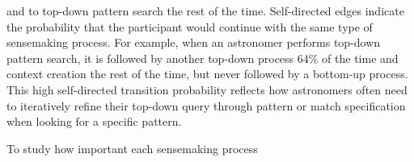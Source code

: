  and to top-down pattern search
 the rest of the time.
 Self-directed edges indicate the probability that the participant
 would continue with the same type of sensemaking process.
 For example, when an astronomer performs top-down pattern search,
 it is followed by another top-down process 64\% of the time and context creation the rest of the time,
 but never followed by a bottom-up process.
 This high self-directed transition probability
 reflects how astronomers often need to iteratively
 refine their top-down query through pattern
 or match specification when looking for a specific pattern. %
 \par To study how important each sensemaking process
